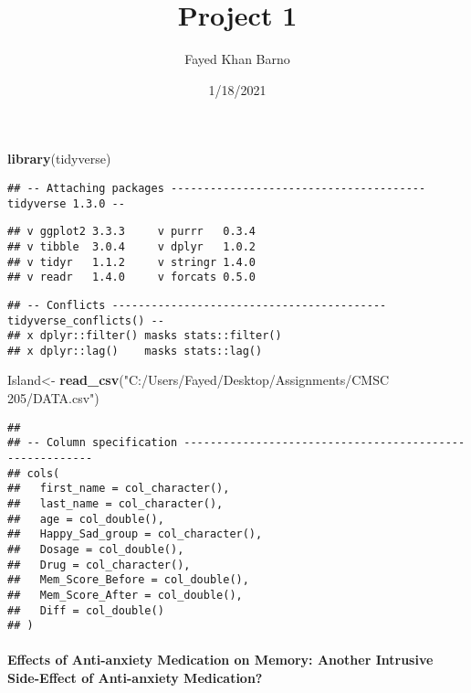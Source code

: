 \documentclass[
]{article}
\title{Project 1}
\author{Fayed Khan Barno}
\date{1/18/2021}
\newenvironment{Shaded}{\begin{snugshade}}{\end{snugshade}}
\newcommand{\KeywordTok}[1]{\textcolor[rgb]{0.13,0.29,0.53}{\textbf{#1}}}
\newcommand{\NormalTok}[1]{#1}
\newcommand{\StringTok}[1]{\textcolor[rgb]{0.31,0.60,0.02}{#1}}
\begin{document}
\maketitle

\begin{Shaded}
\begin{Highlighting}[]
\KeywordTok{library}\NormalTok{(tidyverse)}
\end{Highlighting}
\end{Shaded}

\begin{verbatim}
## -- Attaching packages --------------------------------------- tidyverse 1.3.0 --
\end{verbatim}

\begin{verbatim}
## v ggplot2 3.3.3     v purrr   0.3.4
## v tibble  3.0.4     v dplyr   1.0.2
## v tidyr   1.1.2     v stringr 1.4.0
## v readr   1.4.0     v forcats 0.5.0
\end{verbatim}

\begin{verbatim}
## -- Conflicts ------------------------------------------ tidyverse_conflicts() --
## x dplyr::filter() masks stats::filter()
## x dplyr::lag()    masks stats::lag()
\end{verbatim}

\begin{Shaded}
\begin{Highlighting}[]
\NormalTok{Island<-}\StringTok{ }\KeywordTok{read_csv}\NormalTok{(}\StringTok{"C:/Users/Fayed/Desktop/Assignments/CMSC 205/DATA.csv"}\NormalTok{)}
\end{Highlighting}
\end{Shaded}

\begin{verbatim}
## 
## -- Column specification --------------------------------------------------------
## cols(
##   first_name = col_character(),
##   last_name = col_character(),
##   age = col_double(),
##   Happy_Sad_group = col_character(),
##   Dosage = col_double(),
##   Drug = col_character(),
##   Mem_Score_Before = col_double(),
##   Mem_Score_After = col_double(),
##   Diff = col_double()
## )
\end{verbatim}

\hypertarget{effects-of-anti-anxiety-medication-on-memory-another-intrusive-side-effect-of-anti-anxiety-medication}{%
\paragraph{Effects of Anti-anxiety Medication on Memory: Another
Intrusive Side-Effect of Anti-anxiety
Medication?}\label{effects-of-anti-anxiety-medication-on-memory-another-intrusive-side-effect-of-anti-anxiety-medication}}
\end{document}
